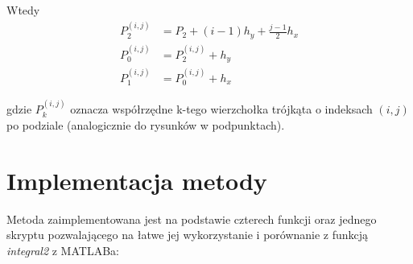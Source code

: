 \documentclass[12pt]{article}
\begin{document}
\begin{enumerate}[label=\textbf{\Roman*}]
		Wtedy
		\begin{align*}
		P_2^{(i,j)} & = P_2 + (i-1)h_y + \frac{j-1}{2}h_x \\
		P_0^{(i,j)} & = P_2^{(i,j)} + h_y                   \\
		P_1^{(i,j)} & = P_0^{(i,j)} + h_x
		\end{align*}
	\end{enumerate}
	gdzie $P_k^{(i,j)}$ oznacza współrzędne k-tego wierzchołka trójkąta o indeksach $(i, j)$ po podziale (analogicznie do rysunków w podpunktach).
	
	
	
	
	
	\section{Implementacja metody}
	Metoda zaimplementowana jest na podstawie czterech funkcji oraz jednego skryptu pozwalającego na łatwe jej wykorzystanie i porównanie z funkcją \textit{integral2} z MATLABa:
\end{document}
